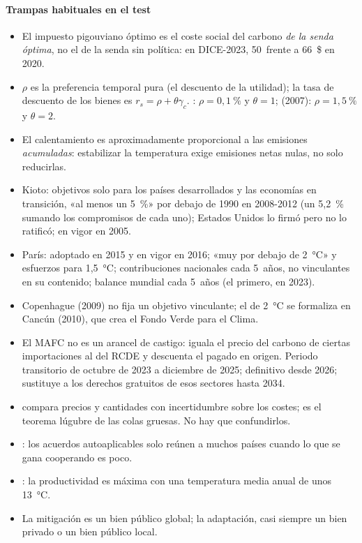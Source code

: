 \documentclass[11pt]{article}
\begin{document}
\paragraph{Trampas habituales en el test}

\begin{itemize}
\item El impuesto pigouviano óptimo es el coste social del carbono \emph{de la senda óptima}, no el de la senda sin política: en DICE-2023, 50~frente a 66~\$ en 2020\nocite{BarrageNordhaus2024DICE}.
\item $\rho$ es la preferencia temporal pura (el descuento de la utilidad); la tasa de descuento de los bienes es $r_s=\rho+\theta\gamma_c$. : $\rho=0{,}1~\%$ y $\theta=1$;  (2007): $\rho=1{,}5~\%$ y $\theta=2$.
\item El calentamiento es aproximadamente proporcional a las emisiones \emph{acumuladas}: estabilizar la temperatura exige emisiones netas nulas, no solo reducirlas.
\item Kioto: objetivos solo para los países desarrollados y las economías en transición, «al menos un 5~\%» por debajo de 1990 en 2008-2012 (un 5,2~\% sumando los compromisos de cada uno); Estados Unidos lo firmó pero no lo ratificó; en vigor en 2005\nocite{ONU1997Kioto}.
\item París: adoptado en 2015 y en vigor en 2016; «muy por debajo de 2~°C» y esfuerzos para 1,5~°C; contribuciones nacionales cada 5~años, no vinculantes en su contenido; balance mundial cada 5~años (el primero, en 2023)\nocite{CMNUCC2015Paris,CMNUCC2023Balance}.
\item Copenhague (2009) no fija un objetivo vinculante; el de 2~°C se formaliza en Cancún (2010), que crea el Fondo Verde para el Clima\nocite{CMNUCC2009Copenhague,CMNUCC2010Cancun}.
\item El MAFC no es un arancel de castigo: iguala el precio del carbono de ciertas importaciones al del RCDE y descuenta el pagado en origen. Periodo transitorio de octubre de 2023 a diciembre de 2025; definitivo desde 2026; sustituye a los derechos gratuitos de esos sectores hasta 2034\nocite{UE2023Reglamento956,UE2023Directiva959}.
\item \textcite{Weitzman1974Prices} compara precios y cantidades con incertidumbre sobre los costes; \textcite{Weitzman2009Modeling} es el teorema lúgubre de las colas gruesas. No hay que confundirlos.
\item \textcite{Barrett1994Self}: los acuerdos autoaplicables solo reúnen a muchos países cuando lo que se gana cooperando es poco.
\item \textcite{BurkeHsiangMiguel2015Global}: la productividad es máxima con una temperatura media anual de unos 13~°C.
\item La mitigación es un bien público global; la adaptación, casi siempre un bien privado o un bien público local.
\end{itemize}
\end{document}
